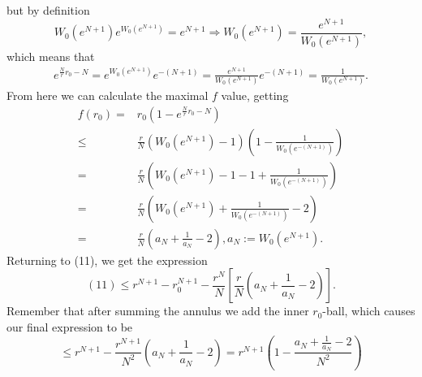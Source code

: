     but by definition
    \[
        W_0(e^{N+1})e^{W_0(e^{N+1})}=e^{N+1}\Rightarrow W_0(e^{N+1})=\frac{e^{N+1}}{W_0(e^{N+1})},
    \]
    which means that
    \begin{align*}
        e^{\frac{N}{r}r_0-N}=e^{W_0(e^{N+1})}e^{-(N+1)}=\frac{e^{N+1}}{W_0(e^{N+1})}e^{-(N+1)}=\frac{1}{W_0(e^{N+1})}.
    \end{align*}
    From here we can calculate the maximal $f$ value, getting
    \begin{align*}
        f(r_0) =& r_0\left(1 - e^{\frac{N}{r}r_0-N}\right) \\
        \leq& \frac{r}{N}\left(W_0(e^{N+1})-1\right)(1-\frac{1}{W_0(e^{-(N+1)})})\\
        =&\frac{r}{N}(W_0(e^{N+1})-1 - 1+\frac{1}{W_0(e^{-(N+1)})})\\
        =&\frac{r}{N}(W_0(e^{N+1})+\frac{1}{W_0(e^{-(N+1)})}-2)\\
        =&\frac{r}{N}(a_N+\frac{1}{a_N}-2), a_N:=W_0(e^{N+1}).
    \end{align*}
    Returning to (11), we get the expression
    \[
        (11) \leq r^{N+1} - r_0^{N+1} - \frac{r^N}{N}\left[\frac{r}{N}(a_N+\frac{1}{a_N}-2)\right].
    \]
    Remember that after summing the annulus we add the inner $r_0$-ball, which causes our final expression to be
    \[
        \leq r^{N+1} - \frac{r^{N+1}}{N^2}(a_N+\frac{1}{a_N}-2)=r^{N+1}\left(1-\frac{a_N+\frac{1}{a_N}-2}{N^2}\right)
    \]

